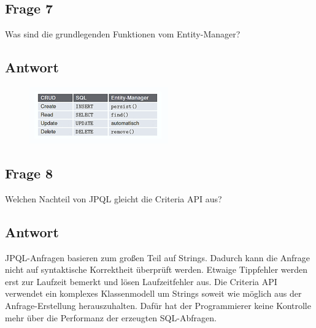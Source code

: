 \subsection*{Frage 7}
Was sind die grundlegenden Funktionen vom Entity-Manager?
\subsection*{Antwort}
\begin{figure}
	\centering
	\includegraphics[width=0.7\linewidth]{screenshot002}
	\caption{}
	\label{fig:screenshot002}
\end{figure}

\subsection*{Frage 8}
Welchen Nachteil von JPQL gleicht die Criteria API aus?
\subsection*{Antwort}
JPQL-Anfragen basieren zum großen Teil auf Strings. Dadurch kann die Anfrage nicht auf syntaktische Korrektheit überprüft werden. Etwaige Tippfehler werden erst zur Laufzeit bemerkt und lösen Laufzeitfehler aus.
Die Criteria API verwendet ein komplexes Klassenmodell um Strings soweit wie möglich aus der Anfrage-Erstellung herauszuhalten. Dafür hat der Programmierer keine Kontrolle mehr über die Performanz der erzeugten SQL-Abfragen.